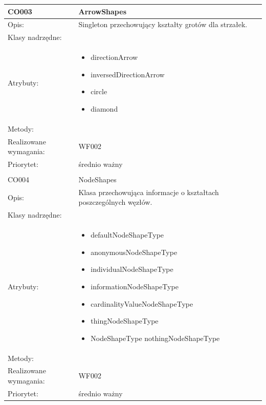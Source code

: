 \documentclass[a4paper,10pt]{article}
\begin{document}
\begin{center}
\begin{longtable}{|m{3cm}|m{9cm}|}
CO003 & ArrowShapes \\ \hline
Opis: & Singleton przechowujący kształty grotów dla strzałek.   \\ \hline
Klasy nadrzędne: &     \\ \hline
Atrybuty: & \begin{itemize}
 \item directionArrow
 \item inversedDirectionArrow
 \item circle
 \item diamond

\end{itemize}
 \\ \hline
Metody: & %
  \\ \hline
Realizowane wymagania: & WF002 \\ \hline
Priorytet: & średnio ważny \\ \hline

\multicolumn{2}{c}{} \\
 \hline

CO004 & NodeShapes \\ \hline
Opis: & Klasa przechowująca informacje o kształtach poszczególnych węzłów.   \\ \hline
Klasy nadrzędne: &     \\ \hline
Atrybuty: & \begin{itemize}
 \item defaultNodeShapeType
 \item anonymousNodeShapeType
 \item individualNodeShapeType
 \item informationNodeShapeType
 \item cardinalityValueNodeShapeType
 \item thingNodeShapeType
 \item NodeShapeType nothingNodeShapeType

\end{itemize}
 \\ \hline
Metody: & %
  \\ \hline
Realizowane wymagania: & WF002 \\ \hline
Priorytet: & średnio ważny \\ \hline


\end{longtable}
\end{center}
\end{document}
